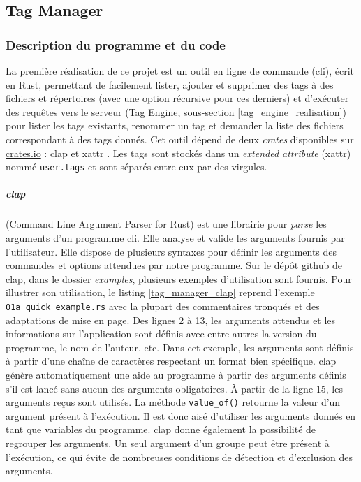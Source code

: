 \subsection{Tag Manager}\label{tag_manager}

\subsubsection{Description du programme et du code}\label{tag_manager_description}
La première réalisation de ce projet est un outil en ligne de commande (\acrshort{cli}), écrit en Rust, permettant 
de facilement lister, ajouter et supprimer des tags à des fichiers et répertoires (avec une option 
récursive pour ces derniers) et d'exécuter des requêtes vers le serveur (Tag Engine, sous-section 
\ref{tag_engine_realisation}) pour lister 
les tags existants, renommer un tag et demander la liste des fichiers correspondant à des tags 
donnés. Cet outil dépend de deux \textit{crates} disponibles sur \href{https://crates.io}{crates.io} 
: clap \cite{ref22} et xattr \cite{ref23}. Les tags sont stockés dans un \textit{extended attribute} 
(\acrshort{xattr}) nommé \texttt{user.tags} et sont séparés entre eux par des virgules.

\subparagraph{clap}
(Command Line Argument Parser for Rust) est une 
librairie pour \textit{parse} les arguments d'un programme \acrshort{cli}. Elle analyse 
et valide les arguments fournis par l'utilisateur. Elle dispose de plusieurs syntaxes pour 
définir les arguments des commandes et options attendues par notre programme. 
Sur le dépôt github de clap, dans le 
dossier \textit{examples}, plusieurs exemples d'utilisation sont fournis. Pour illustrer son 
utilisation, le listing \ref{tag_manager_clap} reprend l'exemple \texttt{01a_quick_example.rs} 
avec la plupart des commentaires tronqués et des adaptations de mise en page. Des lignes 2 à 13, 
les arguments attendus et les informations sur l'application sont définis avec entre autres la 
version du programme, le nom de l'auteur, etc. Dans cet exemple, les arguments sont définis à 
partir d'une chaîne de caractères respectant un format bien spécifique. clap génère automatiquement 
une aide au programme à partir des arguments définis s'il est lancé sans aucun des arguments obligatoires.
À partir de la ligne 15, les arguments reçus sont utilisés. La méthode \texttt{value_of()} 
retourne la valeur d'un argument présent à l'exécution. Il est donc aisé d'utiliser les arguments 
donnés en tant que variables du programme. clap donne également la possibilité de regrouper les 
arguments. Un seul argument d'un groupe peut être présent à l'exécution, ce qui évite de nombreuses 
conditions de détection et d'exclusion des arguments.

